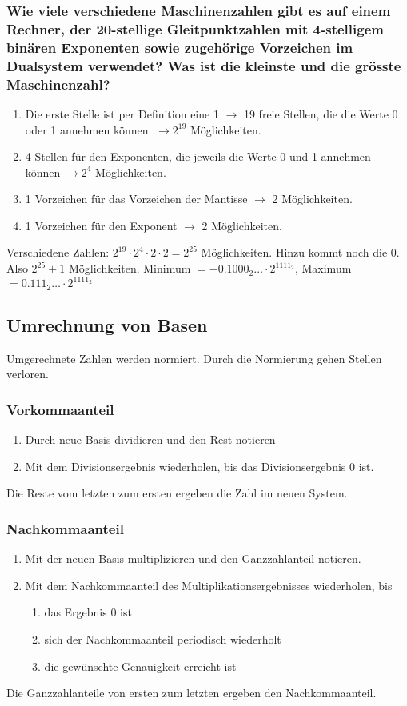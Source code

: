 \subsubsection{Wie viele verschiedene Maschinenzahlen gibt es auf einem Rechner, der 20-stellige Gleitpunktzahlen mit 4-stelligem binären Exponenten
sowie zugehörige Vorzeichen im Dualsystem verwendet? Was ist die kleinste und die grösste Maschinenzahl?}
\begin{enumerate}
 \item Die erste Stelle ist per Definition eine 1 $\rightarrow$ 19 freie Stellen, die die Werte 0 oder 1 annehmen können. $\rightarrow 2^{19}$ Möglichkeiten.
 \item 4 Stellen für den Exponenten, die jeweils die Werte 0 und 1 annehmen können $\rightarrow 2^4$ Möglichkeiten.
 \item 1 Vorzeichen für das Vorzeichen der Mantisse $\rightarrow$ 2 Möglichkeiten.
 \item 1 Vorzeichen für den Exponent $\rightarrow$ 2 Möglichkeiten.
\end{enumerate}
Verschiedene Zahlen: $2^{19} \cdot 2^4 \cdot 2 \cdot 2 = 2^{25}$ Möglichkeiten. Hinzu kommt noch die 0. Also $2^{25} + 1$ Möglichkeiten.
Minimum $= - 0.1000_2\dots \cdot 2^{1111_2}$, Maximum $= 0.111_2\dots \cdot 2^{1111_2}$ 

\subsection{Umrechnung von Basen}
Umgerechnete Zahlen werden normiert. Durch die Normierung gehen Stellen verloren. 
\subsubsection{Vorkommaanteil}
\begin{enumerate}
 \item Durch neue Basis dividieren und den Rest notieren
 \item Mit dem Divisionsergebnis wiederholen, bis das Divisionsergebnis 0 ist.
\end{enumerate}
Die Reste vom letzten zum ersten ergeben die Zahl im neuen System.

\subsubsection{Nachkommaanteil}
\begin{enumerate}
 \item Mit der neuen Basis multiplizieren und den Ganzzahlanteil notieren.
 \item Mit dem Nachkommaanteil des Multiplikationsergebnisses wiederholen, bis
 \begin{enumerate}
    \item das Ergebnis 0 ist
    \item sich der Nachkommaanteil periodisch wiederholt
    \item die gewünschte Genauigkeit erreicht ist
 \end{enumerate}
\end{enumerate}
Die Ganzzahlanteile von ersten zum letzten ergeben den Nachkommaanteil.

